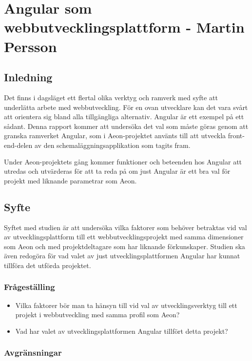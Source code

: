 \chapter{Angular som webbutvecklingsplattform - Martin Persson}

\vspace{1.5em}
\section{Inledning}

Det finns i dagsläget ett flertal olika verktyg och ramverk med syfte att underlätta arbete med webbutveckling. För en ovan utvecklare kan det vara svårt att orientera sig bland alla tillgängliga alternativ. Angular är ett exempel på ett sådant. Denna rapport kommer att undersöka det val som måste göras genom att granska ramverket Angular, som i Aeon-projektet använts till att utveckla front-end-delen av den schemaläggningsapplikation som tagits fram.

Under Aeon-projektets gång kommer funktioner och beteenden hos Angular att utredas och utvärderas för att ta reda på om just Angular är ett bra val för projekt med liknande parametrar som Aeon.

\section{Syfte}

Syftet med studien är att undersöka vilka faktorer som behöver betraktas vid val av utvecklingsplattform till ett webbutvecklingsprojekt med samma dimensioner som Aeon och med projektdeltagare som har liknande förkunskaper. Studien ska även redogöra för vad valet av just utvecklingsplattformen Angular har kunnat tillföra det utförda projektet.

\subsection{Frågeställing}
\begin{itemize}
	\item Vilka faktorer bör man ta hänsyn till vid val av utvecklingsverktyg till ett projekt i webbutveckling med samma profil som Aeon?
	\item Vad har valet av utvecklingsplattformen Angular tillfört detta projekt? 
\end{itemize}

\subsection{Avgränsningar}

